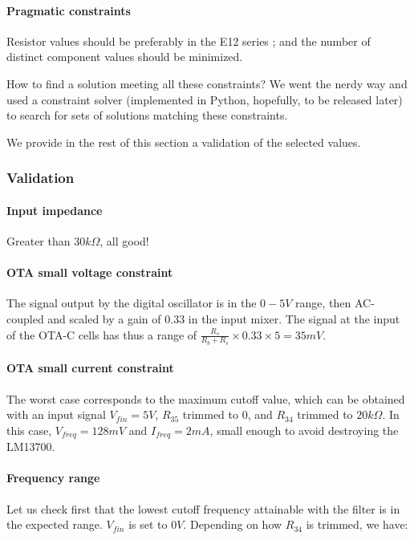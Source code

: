 \documentclass[a4paper,11pt]{article}
\begin{document}
\paragraph{Pragmatic constraints} Resistor values should be preferably in the E12 series ; and the number of distinct component values should be minimized.

How to find a solution meeting all these constraints? We went the nerdy way and used a constraint solver (implemented in Python, hopefully, to be released later) to search for sets of solutions matching these constraints.

We provide in the rest of this section a validation of the selected values.

\subsubsection{Validation}

\paragraph{Input impedance} Greater than $30k\Omega$, all good!

\paragraph{OTA small voltage constraint} The signal output by the digital oscillator is in the $0-5V$ range, then AC-coupled and scaled by a gain of $0.33$ in the input mixer. The signal at the input of the OTA-C cells has thus a range of $\frac{R_s}{R_b + R_s} \times 0.33 \times 5 = 35mV$.

\paragraph{OTA small current constraint} The worst case corresponds to the maximum cutoff value, which can be obtained with an input signal $V_{fin} = 5V$, $R_{35}$ trimmed to 0, and $R_{34}$ trimmed to $20k\Omega$. In this case, $V_{freq} = 128mV$ and $I_{freq} = 2mA$, small enough to avoid destroying the LM13700.

\paragraph{Frequency range} Let us check first that the lowest cutoff frequency attainable with the filter is in the expected range. $V_{fin}$ is set to $0V$. Depending on how $R_{34}$ is trimmed, we have:
\end{document}
